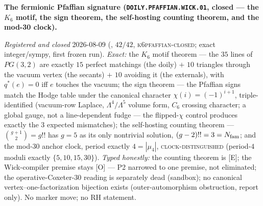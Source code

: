 \par\smallskip\noindent\textbf{The fermionic Pfaffian signature
(\texttt{DOILY.PFAFFIAN.\allowbreak WICK.01}, closed --- the
$K_6$ motif, the sign theorem, the self-hosting counting
theorem, and the mod-30 clock).}
{\sloppy
\emph{Registered and closed} 2026-08-09
(, $42/42$,
\textsc{k6pfaffian-closed}; exact integer/sympy, first frozen
run).  \emph{Exact:} the $K_6$ motif theorem --- the $35$ lines
of $PG(3,2)$ are exactly $15$ perfect matchings (the doily) $+$
$10$ triangles through the vacuum vertex (the secants) $+$ $10$
avoiding it (the externals), with $q^{*}(e) = 0$ iff $e$
touches the vacuum; the sign theorem --- the Pfaffian signs
match the Hodge table under the canonical character $\chi(i) =
(-1)^{i+1}$, triple-identified (vacuum-row Laplace,
$\Lambda^4/\Lambda^5$ volume form, $C_6$ crossing character; a
global gauge, not a line-dependent fudge --- the flipped-$\chi$
control produces exactly the $3$ expected mismatches); the
self-hosting counting theorem --- $\binom{g+1}{2} = g!!$ has $g
= 5$ as its only nontrivial solution, $(g-2)!! = 3 = N_{\mathrm{fam}}$;
and the mod-$30$ anchor clock, period exactly $4 = |\mu_4|$,
\textsc{clock-distinguished} (period-$4$ moduli exactly $\{5,
10, 15, 30\}$).  \emph{Typed honestly:} the counting theorem is
[E]; the Wick-compiler premise stays [O] --- P2 narrowed to one
premise, not eliminated; the operative-Coxeter-$30$ reading is
separately dead (sandbox); no canonical
vertex--one-factorization bijection exists (outer-automorphism
obstruction, report only).  No marker move; no RH
statement.\par}


